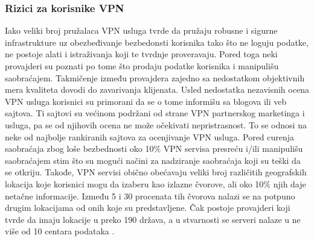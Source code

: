 \documentclass[a4paper]{article}
\begin{document}
\subsubsection{Rizici za korisnike VPN} 
\label{subsec:riziciVPN}
Iako veliki broj pružalaca VPN usluga  tvrde da pružaju robusne i sigurne infrastrukture uz obezbeđivanje bezbedonsti korisnika tako što ne loguju podatke, ne postoje alati i istraživanja koji te tvrdnje proveravaju. Pored toga neki provajderi su poznati po tome što prodaju podatke korisnika i manipulišu saobraćajem. Takmičenje između provajdera zajedno sa nedostatkom objektivnih mera kvaliteta dovodi do zavarivanja klijenata. Usled nedostatka nezavisnih ocena VPN usluga korisnici su primorani da se o tome informišu sa blogova ili veb sajtova. Ti sajtovi su većinom podržani od strane VPN partnerskog marketinga i usluga, pa se od njihovih ocena ne može očekivati nepristrasnost. To se odnosi na neke od najbolje rankiranih sajtova za ocenjivanje VPN usluga. Pored curenja saobraćaja zbog loše bezbednosti oko 10\% VPN servisa presreću i/ili manipulišu saobraćajem stim što su mogući načini za nadziranje saobraćaja koji su teški da se otkriju. Takođe, VPN servisi obično obećavaju veliki broj različitih geografskih lokacija koje korisnici mogu da izaberu kao izlazne čvorove, ali oko 10\% njih daje netačne informacije. Između 5 i 30 procenata tih čvorova nalazi se na potpuno drugim lokacijama od onih koje su predstavljene. Čak postoje provajderi koji tvrde da imaju lokacije u preko 190 država, a u stvarnosti se serveri nalaze u ne više od 10 centara podataka \cite{vpn5}.

 
\end{document}
